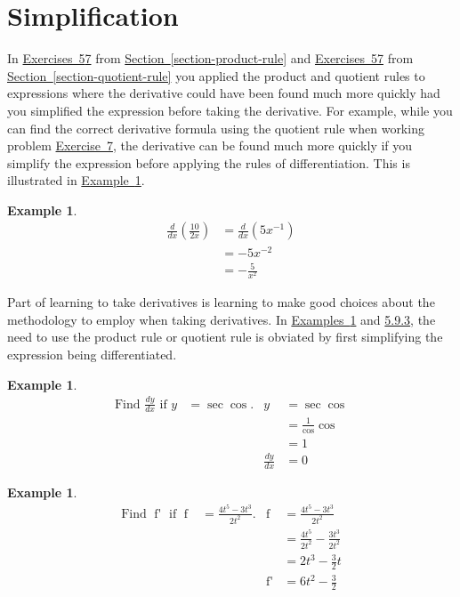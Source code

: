 \documentclass[12pt,]{book}
\theoremstyle{plain}
\theoremstyle{definition}
\newtheorem{example}[theorem]{Example}
\numberwithin{equation}{section}
\newcommand{\fe}[2]{\mathop{{#1}{\left(#2\right)}}}
\newcommand{\fd}[1]{#1'}
\newcommand{\lz}[2]{\frac{d#1}{d#2}}
\newcommand{\lzoo}[2]{{\frac{d}{d#1}}{\left(#2\right)}}
\begin{document}
\typeout{************************************************}
\typeout{************************************************}
\section[Simplification]{Simplification}\label{section-simplification}
In \hyperref[unsimplified-product-first]{Exercises~5}\textendash{}\hyperref[unsimplified-product-last]{7} from \hyperref[section-product-rule]{Section~\ref*{section-product-rule}} and \hyperref[unsimplified-quotient-first]{Exercises~5}\textendash{}\hyperref[unsimplified-quotient-last]{7} from \hyperref[section-quotient-rule]{Section~\ref*{section-quotient-rule}} you applied the product and quotient rules to expressions where the derivative could have been found much more quickly had you simplified the expression before taking the derivative.  For example, while you can find the correct derivative formula using the quotient rule when working problem \hyperref[unsimplified-quotient-last]{Exercise~7}, the derivative can be found much more quickly if you simplify the expression before applying the rules of differentiation. This is illustrated in \hyperref[example-simplify-first]{Example~\ref*{example-simplify-first}}.%
\begin{example}\label{example-simplify-first}
\begin{align*}
\lzoo{x}{\frac{10}{2x}}&=\lzoo{x}{5x^{-1}}\\
&=-5x^{-2}\\
&=-\frac{5}{x^{2}}
\end{align*}%
\end{example}
\par
Part of learning to take derivatives is learning  to make good choices about the methodology to employ when taking derivatives.  In \hyperref[example-simplify-second]{Examples~\ref*{example-simplify-second}} and \hyperref[example-simplify-third]{5.9.3}, the need to use the product rule or quotient rule is obviated by first simplifying the expression being differentiated.%
\begin{example}\label{example-simplify-second}
\begin{align*}
\text{Find }\lz{y}{x}\text{ if }y&=\fe{\sec}{x}\fe{\cos}{x}\text{.}&y&=\fe{\sec}{x}\fe{\cos}{x}\\
&&&=\frac{1}{\fe{\cos}{x}}\fe{\cos}{x}\\
&&&=1\\
&&\lz{y}{x}&=0
\end{align*}%
\end{example}
\begin{example}\label{example-simplify-third}
\begin{align*}
\text{Find }\fe{\fd{f}}{t}\text{ if }\fe{f}{t}&=\frac{4t^5-3t^3}{2t^2}\text{.}&\fe{f}{t}&=\frac{4t^5-3t^3}{2t^2}\\
&&&=\frac{4t^5}{2t^2}-\frac{3t^3}{2t^2}\\
&&&=2t^3-\frac{3}{2}t\\
&&\fe{\fd{f}}{t}&=6t^2-\frac{3}{2}
\end{align*}%
\end{example}
\typeout{************************************************}
\typeout{************************************************}
\end{document}
